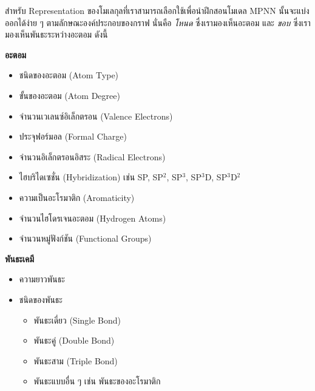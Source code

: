 สำหรับ Representation ของโมเลกุลที่เราสามารถเลือกใช้เพื่อนำฝึกสอนโมเดล MPNN นั้นจะแบ่งออกได้ง่าย ๆ ตามลักษณะองค์ประกอบของกราฟ 
นั่นคือ \textit{โหนด} ซึ่งเรามองเห็นอะตอม และ \textit{ขอบ} ซึ่งเรามองเห็นพันธะระหว่างอะตอม ดังนี้

\noindent \textbf{อะตอม}

\begin{itemize}[topsep=0pt]
    \item ชนิดของอะตอม (Atom Type)
    
    \item ขั้นของอะตอม (Atom Degree)
    
    \item จำนวนเวเลนซ์อิเล็กตรอน (Valence Electrons)
    
    \item ประจุฟอร์มอล (Formal Charge)
    
    \item จำนวนอิเล็กตรอนอิสระ (Radical Electrons)
    
    \item ไฮบริไดเซชั่น (Hybridization) เช่น SP, SP$^2$, SP$^3$, SP$^3$D, SP$^3$D$^2$
    
    \item ความเป็นอะโรมาติก (Aromaticity)
    
    \item จำนวนไฮโดรเจนอะตอม (Hydrogen Atoms)
    
    \item จำนวนหมู่ฟังก์ชัน (Functional Groups)
\end{itemize}

\medskip

\noindent \textbf{พันธะเคมี}

\begin{itemize}[topsep=0pt]
    \item ความยาวพันธะ
    
    \item ชนิดของพันธะ
    \begin{itemize}[topsep=0pt]
        \item พันธะเดี่ยว (Single Bond)
        
        \item พันธะคู่ (Double Bond)
        
        \item พันธะสาม (Triple Bond)
        
        \item พันธะแบบอื่น ๆ เช่น พันธะของอะโรมาติก
    \end{itemize}
\end{itemize}

